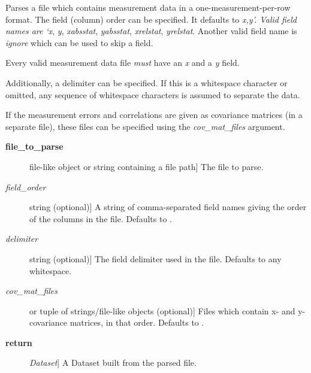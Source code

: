 \documentclass[a4paper,10pt,english]{sphinxmanual}
\begin{document}
\begin{fulllineitems}
\label{index:kafe.file_tools.parse_column_data}
Parses a file which contains measurement data in a one-measurement-per-row
format. The field (column) order can be specified. It defaults to \emph{x,y'.
Valid field names are {}`x}, \emph{y}, \emph{xabsstat}, \emph{yabsstat}, \emph{xrelstat},
\emph{yrelstat}. Another valid field name is \emph{ignore} which can be used to skip
a field.

Every valid measurement data file \emph{must} have an \emph{x} and a \emph{y} field.

Additionally, a delimiter can be specified. If this is a whitespace
character or omitted, any sequence of whitespace characters is assumed to
separate the data.

If the measurement errors and correlations are given as covariance matrices
(in a separate file), these files can be specified using the
\emph{cov\_mat\_files} argument.
\begin{description}
\item[{\textbf{file\_to\_parse}}] \leavevmode{[}file-like object or string containing a file path{]}
The file to parse.

\item[{\emph{field\_order}}] \leavevmode{[}string (optional){]}
A string of comma-separated field names giving the order of the columns
in the file. Defaults to .

\item[{\emph{delimiter}}] \leavevmode{[}string (optional){]}
The field delimiter used in the file. Defaults to any whitespace.

\item[{\emph{cov\_mat\_files}}] \leavevmode{[} or tuple of strings/file-like objects (optional){]}
Files which contain x- and y-covariance matrices, in that order.
Defaults to .

\item[{\textbf{return}}] \leavevmode{[}\emph{Dataset}{]}
A Dataset built from the parsed file.

\end{description}

\end{fulllineitems}

\end{document}

